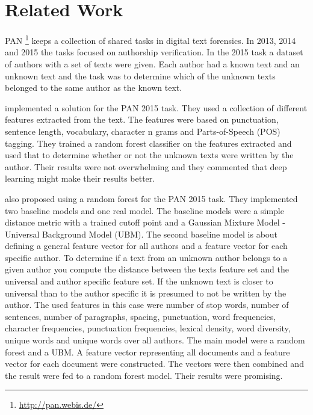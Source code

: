 \section{Related Work}


PAN \footnote{\url{http://pan.webis.de/}} keeps a collection of shared tasks in
digital text forensics. In 2013, 2014 and 2015 the tasks focused on authorship
verification. In the 2015 task a dataset of authors with a set of texts were
given. Each author had a known text and an unknown text and the task was to
determine which of the unknown texts belonged to the same author as the known
text.



\cite{maitra2015} implemented a solution for the PAN 2015 task. They used a
collection of different features extracted from the text. The features were
based on punctuation, sentence length, vocabulary, character n grams and
Parts-of-Speech (POS) tagging. They trained a random forest classifier on the
features extracted and used that to determine whether or not the unknown texts
were written by the author. Their results were not overwhelming and they
commented that deep learning might make their results better.

\cite{pacheco2015} also proposed using a random forest for the PAN 2015 task.
They implemented two baseline models and one real model. The baseline models
were a simple distance metric with a trained cutoff point and a Gaussian Mixture
Model - Universal Background Model (UBM). The second baseline model is about
defining a general feature vector for all authors and a feature vector for
each specific author. To determine if a text from an unknown author belongs
to a given author you compute the distance between the texts feature set and
the universal and author specific feature set. If the unknown text is closer
to universal than to the author specific it is presumed to not be written by
the author. The used features in this case were number of stop words, number
of sentences, number of paragraphs, spacing, punctuation, word frequencies,
character frequencies, punctuation frequencies, lexical density, word diversity,
unique words and unique words over all authors. The main model were a random
forest and a UBM. A feature vector representing all documents and a feature
vector for each document were constructed. The vectors were then combined and
the result were fed to a random forest model. Their results were promising.


